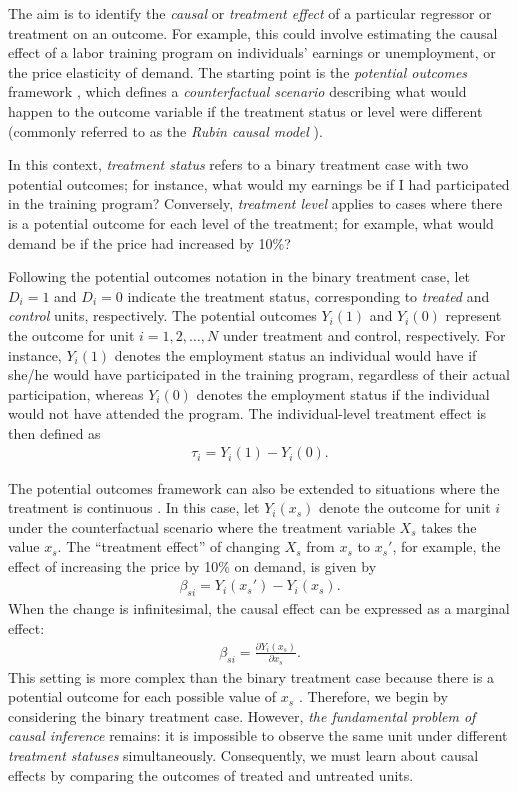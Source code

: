 The aim is to identify the \textit{causal} or \textit{treatment effect} of a particular regressor or treatment on an outcome. For example, this could involve estimating the causal effect of a labor training program on individuals’ earnings or unemployment, or the price elasticity of demand. The starting point is the \textit{potential outcomes} framework \cite{rubin1974}, which defines a \textit{counterfactual scenario} describing what would happen to the outcome variable if the treatment status or level were different (commonly referred to as the \textit{Rubin causal model} \cite{holland1986statistics}).

In this context, \textit{treatment status} refers to a binary treatment case with two potential outcomes; for instance, what would my earnings be if I had participated in the training program? Conversely, \textit{treatment level} applies to cases where there is a potential outcome for each level of the treatment; for example, what would demand be if the price had increased by 10\%?

Following the potential outcomes notation in the binary treatment case, let $D_i = 1$ and $D_i = 0$ indicate the treatment status, corresponding to \textit{treated} and \textit{control} units, respectively. The potential outcomes $Y_i(1)$ and $Y_i(0)$ represent the outcome for unit $i = 1, 2, \dots, N$ under treatment and control, respectively. For instance, $Y_i(1)$ denotes the employment status an individual would have if she/he would have participated in the training program, regardless of their actual participation, whereas $Y_i(0)$ denotes the employment status if the individual would not have attended the program. The individual-level treatment effect is then defined as
\begin{align*}
	\tau_i = Y_i(1) - Y_i(0).
\end{align*}

The potential outcomes framework can also be extended to situations where the treatment is continuous \cite{imbens2014ivperspective}. In this case, let $Y_i(x_s)$ denote the outcome for unit $i$ under the counterfactual scenario where the treatment variable $X_s$ takes the value $x_s$. The ``treatment effect'' of changing $X_s$ from $x_s$ to $x_s'$, for example, the effect of increasing the price by 10\% on demand, is given by
\begin{align*}
	\beta_{si} = Y_i(x_s') - Y_i(x_s).
\end{align*}
When the change is infinitesimal, the causal effect can be expressed as a marginal effect:
\begin{align*}
	\beta_{si} =\frac{\partial Y_i(x_s)}{\partial x_s}.
\end{align*}
This setting is more complex than the binary treatment case because there is a potential outcome for each possible value of $x_s$ \cite{gill2001causal}. Therefore, we begin by considering the binary treatment case. However, \textit{the fundamental problem of causal inference} \cite{holland1986statistics} remains: it is impossible to observe the same unit under different \textit{treatment statuses} simultaneously. Consequently, we must learn about causal effects by comparing the outcomes of treated and untreated units.

